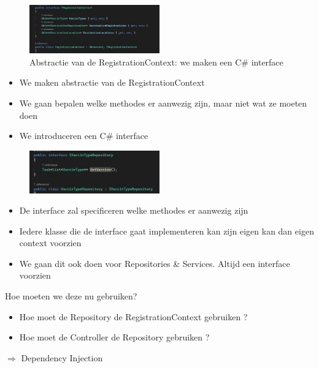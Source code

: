 \documentclass{article}
\begin{document}
\begin{figure}[H]
    \centering
    \includegraphics[width=0.5\textwidth]{repositories-3.png}
    \caption{Abstractie van de RegistrationContext: we maken een C\# interface}
\end{figure}

\begin{itemize}
    \item We maken abstractie van de RegistrationContext
    \item We gaan bepalen welke methodes er aanwezig zijn, maar niet wat ze moeten doen
    \item We introduceren een C\# interface
\end{itemize}

\begin{figure}[H]
    \centering
    \includegraphics[width=0.5\textwidth]{repositories-4.png}
    \caption{}
\end{figure}

\begin{itemize}
    \item De interface zal specificeren welke methodes er aanwezig zijn
    \item Iedere klasse die de interface gaat implementeren kan zijn eigen kan dan eigen context voorzien
    \item We gaan dit ook doen voor Repositories \& Services. Altijd een interface voorzien
\end{itemize}

Hoe moeten we deze nu gebruiken?

\begin{itemize}
    \item Hoe moet de Repository de RegistrationContext gebruiken ?
    \item Hoe moet de Controller de Repository gebruiken ?
\end{itemize}

$\Rightarrow$ Dependency Injection
\end{document}
